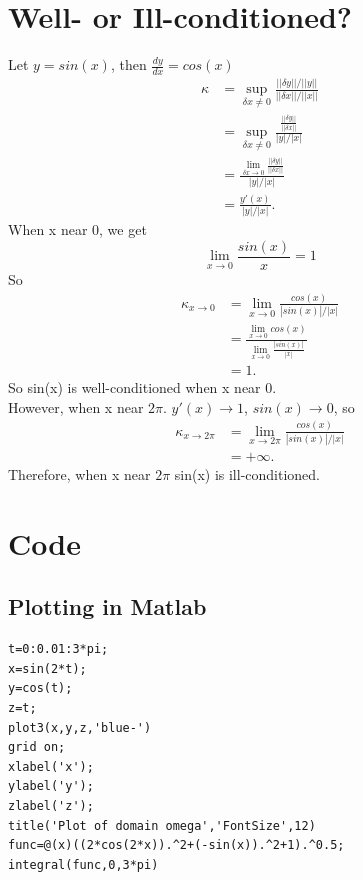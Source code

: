 \documentclass{article}
\begin{document}
\section{ Well- or Ill-conditioned?}
Let $y=sin(x)$, then $\frac{dy}{dx}=cos(x)$
\begin{equation}
\begin{split}
\kappa &=\sup_{\delta x\neq 0}\frac{||\delta y||/||y||}{||\delta x||/||x||} \\
&=\sup_{\delta x\neq 0}\frac{\frac{||\delta y||}{||\delta x||}}{|y|/|x|}\\
&=\frac{\lim\limits_{\delta x\to 0}\frac{||\delta y||}{||\delta x||}}{|y|/|x|}\\
&=\frac{y'(x)}{|y|/|x|}.
\end{split}
\end{equation}
When x near 0, we get 
\begin{equation}
\lim_{x \to 0}\frac{sin(x)}{x}=1
\end{equation}
So 
\begin{equation}
\begin{split}
\kappa_{x \to 0}&=\lim_{x \to 0}\frac{cos(x)}{|sin(x)|/|x|}\\
&=\frac{\lim\limits_{x \to 0}cos(x)}{\lim\limits_{x \to 0}\frac{|sin(x)|}{|x|}}\\
&=1.
\end{split}
\end{equation}
So sin(x) is well-conditioned when x near 0.\\
 However, when x near $2\pi$. $y'(x)\to 1$, $sin(x)\to 0$, so
\begin{equation}
\begin{split}
\kappa_{x \to 2\pi}&=\lim_{x \to 2\pi}\frac{cos(x)}{|sin(x)|/|x|}\\
&=+\infty.
\end{split}
\end{equation}
Therefore, when x near $2\pi$ sin(x) is ill-conditioned.




\section{Code}

\subsection{Plotting in Matlab}
\begin{lstlisting}
t=0:0.01:3*pi;
x=sin(2*t);
y=cos(t);
z=t;
plot3(x,y,z,'blue-')
grid on;
xlabel('x');
ylabel('y');
zlabel('z');
title('Plot of domain omega','FontSize',12)
func=@(x)((2*cos(2*x)).^2+(-sin(x)).^2+1).^0.5;
integral(func,0,3*pi)
\end{lstlisting}
\end{document}
